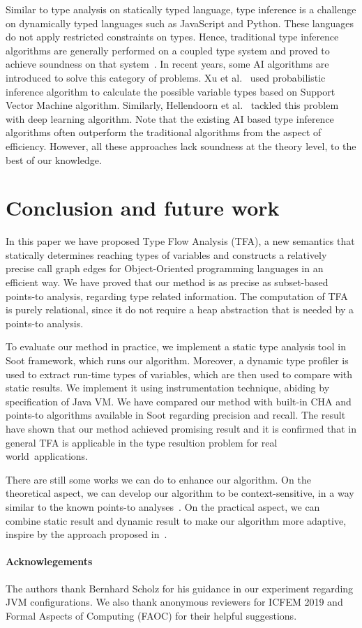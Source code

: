 \documentclass{fac}
\begin{document}
Similar to type analysis on statically typed language, type inference is a challenge on dynamically typed languages such as JavaScript and Python. These languages do not apply restricted constraints on types. Hence, traditional type inference algorithms are generally performed on a coupled type system and proved to achieve soundness on that system~\cite{Chandra2016}. In recent years, some AI algorithms are introduced to solve this category of problems. Xu et al.~\cite{Xu2016} used probabilistic inference algorithm to calculate the possible variable types based on Support Vector Machine algorithm. Similarly, Hellendoorn et al.~\cite{Hellendoorn2018} tackled this problem with deep learning algorithm. Note that the existing AI based type inference algorithms often outperform the traditional algorithms from the aspect of efficiency. However, all these approaches lack soundness at the theory level, to the best of our knowledge.

\section{Conclusion and future work}\label{sec:conclusion}
In this paper we have proposed Type Flow Analysis (TFA), a new semantics that statically determines reaching types of variables and constructs a relatively precise call graph edges for Object-Oriented programming languages in an efficient way. We have proved that our method is as precise as subset-based points-to analysis, regarding type related information. The computation of TFA is purely relational, since it do not require a heap abstraction that is needed by a points-to analysis.

To evaluate our method in practice, we implement a static type analysis tool in Soot framework, which runs our algorithm. Moreover, a dynamic type profiler is used to extract run-time types of variables, which are then used to compare with static results. We implement it using instrumentation technique, abiding by specification of Java VM. We have compared our method with built-in CHA and points-to algorithms available in Soot regarding precision and recall. The result have shown that our method achieved promising result and it is confirmed that in general TFA is applicable in the type resultion problem for real world~applications.

There are still some works we can do to enhance our algorithm. On the theoretical aspect, we can develop our algorithm to be context-sensitive, in a way similar to the known points-to analyses~\cite{Milanova2005,Smaragdakis11}. On the practical aspect, we can combine static result and dynamic result to make our algorithm more adaptive, inspire by the approach proposed in~\cite{Codrut2014}.

\paragraph{Acknowlegements} The authors thank Bernhard Scholz for his guidance in our experiment regarding JVM configurations. We also thank anonymous reviewers for ICFEM 2019 and Formal Aspects of Computing (FAOC) for their helpful suggestions.
\label{lastpage}



\end{document}
